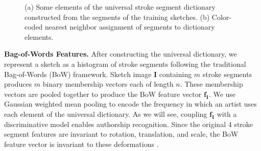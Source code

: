 \vspace{-4mm}
\begin{figure}[ht]
\centering
{}
\vspace{-3mm}
\caption{(a) Some elements of the universal stroke segment dictionary constructed from the segments of the training sketches. (b) Color-coded nearest neighbor assignment of segments to dictionary elements.}\vspace{-2mm}
\label{fig:bagOfWords}
\end{figure}

\noindent\textbf{Bag-of-Words Features.} After constructing the universal dictionary, we represent a sketch as a histogram of stroke segments following the traditional Bag-of-Words (BoW) framework. Sketch image $\mathbf{I}$ containing $m$ stroke segments produces $m$ binary membership vectors each of length $n$. These membership vectors are pooled together to produce the BoW feature vector $\mathbf{f}_{\mathbf{I}}$. We use Gaussian weighted mean pooling to encode the frequency in which an artist uses each element of the universal dictionary. As we will see, coupling $\mathbf{f}_{\mathbf{I}}$ with a discriminative model enables authorship recognition. Since the original 4 stroke segment features are invariant to rotation, translation, and scale, the BoW feature vector is invariant to these deformations \cite{lu2007survey}.


